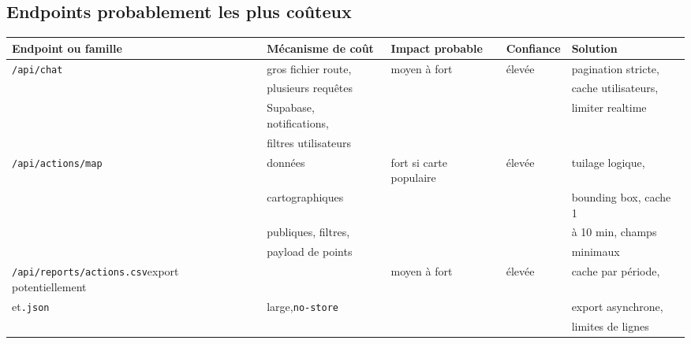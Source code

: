 \documentclass[
  10pt,
  a4paper,
  DIV=11,
  numbers=noendperiod,
  oneside]{scrreprt}
\newcounter{none} %
\begin{document}
\subsection{Endpoints probablement les plus
coûteux}\label{endpoints-probablement-les-plus-couxfbteux}

{\def\LTcaptype{none} %
\begin{longtable}[]{@{}
  >{\raggedright\arraybackslash}p{}
  >{\raggedright\arraybackslash}p{}
  >{\raggedright\arraybackslash}p{}
  >{\raggedright\arraybackslash}p{}
  >{\raggedright\arraybackslash}p{}@{}}
\toprule\noalign{}
\begin{minipage}[b]{\linewidth}\raggedright
Endpoint ou famille
\end{minipage} & \begin{minipage}[b]{\linewidth}\raggedright
Mécanisme de coût
\end{minipage} & \begin{minipage}[b]{\linewidth}\raggedright
Impact probable
\end{minipage} & \begin{minipage}[b]{\linewidth}\raggedright
Confiance
\end{minipage} & \begin{minipage}[b]{\linewidth}\raggedright
Solution
\end{minipage} \\
\midrule\noalign{}
\endhead
\bottomrule\noalign{}
\endlastfoot
\texttt{/api/chat} & gros fichier route, & moyen à fort & élevée &
pagination stricte, \\
& plusieurs requêtes & & & cache utilisateurs, \\
& Supabase, notifications, & & & limiter realtime \\
& filtres utilisateurs & & & \\
\texttt{/api/actions/map} & données & fort si carte populaire & élevée &
tuilage logique, \\
& cartographiques & & & bounding box, cache 1 \\
& publiques, filtres, & & & à 10 min, champs \\
& payload de points & & & minimaux \\
\texttt{/api/reports/actions.csv}export potentiellement & & moyen à fort
& élevée & cache par période, \\
et\texttt{.json} & large,\texttt{no-store} & & & export asynchrone, \\
& & & & limites de lignes \\
\end{longtable}
}
\end{document}
